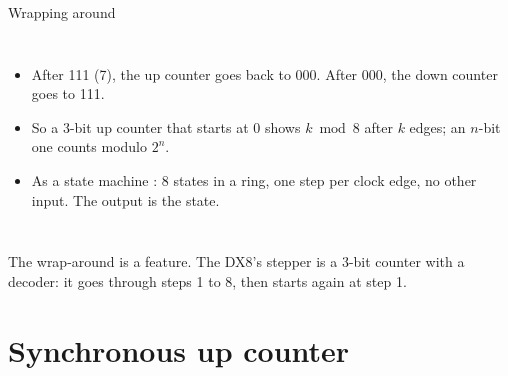 \documentclass[10pt]{wosm-slides}
\begin{document}
\begin{frame}{Wrapping around}
  \begin{columns}[c, totalwidth=\textwidth]
      \begin{itemize}
        \item After 111 (7), the up counter goes back to 000. After 000, the down
          counter goes to 111.
        \item So a 3-bit up counter that starts at 0 shows $k \bmod 8$ after
          $k$ edges; an $n$-bit one counts modulo $2^n$.
        \item As a state machine : 8 states in a ring, one step per
          clock edge, no other input. The output is the state.
      \end{itemize}
      \centering
  \end{columns}

  \begin{remark}
    The wrap-around is a feature. The DX8's stepper  is a 3-bit counter
    with a decoder: it goes through steps 1 to 8, then starts again at step 1.
  \end{remark}
\end{frame}

\section{Synchronous up counter}
\end{document}
